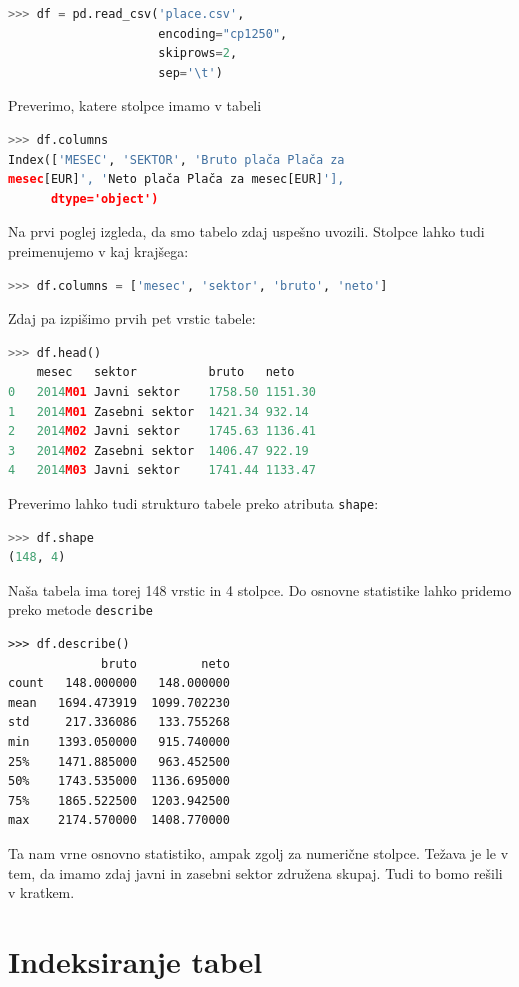 \begin{lstlisting}[language=python]
>>> df = pd.read_csv('place.csv', 
                     encoding="cp1250", 
                     skiprows=2, 
                     sep='\t')
\end{lstlisting}
Preverimo, katere stolpce imamo v tabeli
\begin{lstlisting}[language=python]
>>> df.columns
Index(['MESEC', 'SEKTOR', 'Bruto plača Plača za
mesec[EUR]', 'Neto plača Plača za mesec[EUR]'],
      dtype='object')
\end{lstlisting}
Na prvi poglej izgleda, da smo tabelo zdaj uspešno uvozili. Stolpce lahko tudi preimenujemo v kaj krajšega:
\begin{lstlisting}[language=python]
>>> df.columns = ['mesec', 'sektor', 'bruto', 'neto']
\end{lstlisting}
Zdaj pa izpišimo prvih pet vrstic tabele:
\begin{lstlisting}[language=python]
>>> df.head()
    mesec   sektor          bruto   neto  
0   2014M01 Javni sektor    1758.50 1151.30
1   2014M01 Zasebni sektor  1421.34 932.14
2   2014M02 Javni sektor    1745.63 1136.41
3   2014M02 Zasebni sektor  1406.47 922.19
4   2014M03 Javni sektor    1741.44 1133.47
\end{lstlisting}
Preverimo lahko tudi strukturo tabele preko atributa \texttt{shape}:
\begin{lstlisting}[language=python]
>>> df.shape
(148, 4)
\end{lstlisting}
Naša tabela ima torej 148 vrstic in 4 stolpce. Do osnovne statistike lahko pridemo preko metode \texttt{describe}
\begin{lstlisting}
>>> df.describe()
             bruto         neto
count   148.000000   148.000000
mean   1694.473919  1099.702230
std     217.336086   133.755268
min    1393.050000   915.740000
25%    1471.885000   963.452500
50%    1743.535000  1136.695000
75%    1865.522500  1203.942500
max    2174.570000  1408.770000
\end{lstlisting}
Ta nam vrne osnovno statistiko, ampak zgolj za numerične stolpce. Težava je le v tem, da imamo zdaj javni in zasebni sektor združena skupaj. Tudi to bomo rešili v kratkem.

\section{Indeksiranje tabel}

